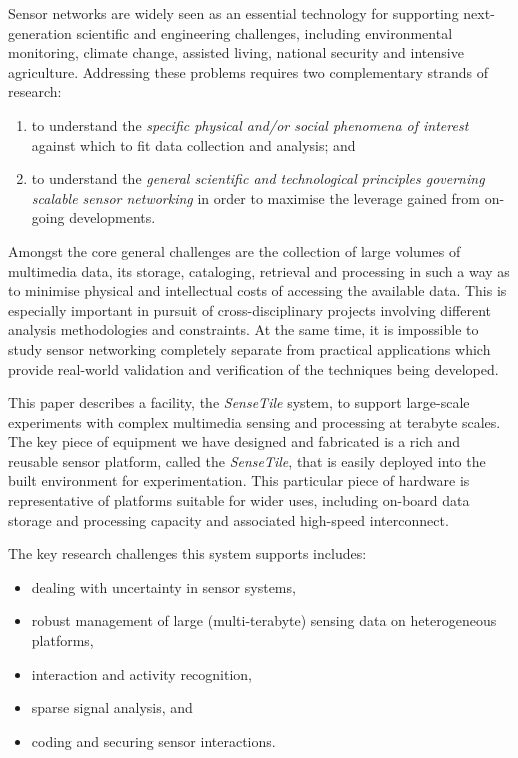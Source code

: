 \documentclass[times,10pt,twocolumn]{article}
\newcommand{\ST}{\emph{SenseTile}\xspace}
\begin{document}

Sensor networks are widely seen as an essential technology for
supporting next-generation scientific and engineering challenges,
including environmental monitoring, climate change, assisted living,
national security and intensive agriculture. Addressing these problems
requires two complementary strands of research:
\begin{enumerate}
\item to understand the \emph{specific physical and/or social
    phenomena of interest} against which to fit data collection and
  analysis; and
\item to understand the \emph{general scientific and technological
    principles governing scalable sensor networking} in order to
  maximise the leverage gained from on-going developments.
\end{enumerate}
 
Amongst the core general challenges are the collection of large
volumes of multimedia data, its storage, cataloging, retrieval and
processing in such a way as to minimise physical and intellectual
costs of accessing the available data. This is especially important in
pursuit of cross-disciplinary projects involving different analysis
methodologies and constraints. At the same time, it is impossible to
study sensor networking completely separate from practical
applications which provide real-world validation and verification of
the techniques being developed.

This paper describes a facility, the \ST system, to support
large-scale experiments with complex multimedia sensing and processing
at terabyte scales.  The key piece of equipment we have designed and
fabricated is a rich and reusable sensor platform, called the \ST,
that is easily deployed into the built environment for
experimentation.  This particular piece of hardware is representative
of platforms suitable for wider uses, including on-board data storage
and processing capacity and associated high-speed interconnect.

The key research challenges this system supports includes:
\begin{itemize}
  \setlength{\itemsep}{1pt}
  \setlength{\parskip}{0pt}
  \setlength{\parsep}{0pt}
\item dealing with uncertainty in sensor systems,
\item robust management of large (multi-terabyte) sensing data on
  heterogeneous platforms,
\item interaction and activity recognition,
\item sparse signal analysis, and
\item coding and securing sensor interactions.
\end{itemize}
\end{document}
